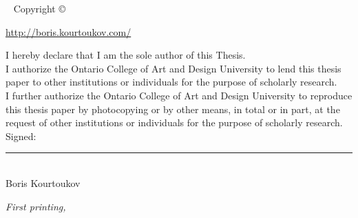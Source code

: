
\blankpage

\newpage\thispagestyle{empty}
\openepigraph{%
}{}
\vfill
{}
\vfill
\openepigraph{%
}{}


\maketitle


\newpage
\begin{fullwidth}
~\vfill
\thispagestyle{empty}
\setlength{\parindent}{0pt}
\setlength{\parskip}{\baselineskip}
Copyright \copyright\ \the\year\ \thanklessauthor

\par{\url{http://boris.kourtoukov.com/}}

\par I hereby declare that I am the sole author of this Thesis. \\
\vspace{1em}
I authorize the Ontario College of Art and Design University to lend this thesis paper to other institutions or individuals for the purpose of scholarly research. \\
\vspace{1em}
I further authorize the Ontario College of Art and Design University to reproduce this thesis paper by photocopying or by other means, in total or in part, at the request of other institutions or individuals for the purpose of scholarly research. \\

\vspace{2em}
Signed: \\
\hspace{3.5em}\noindent\rule{8cm}{0.5pt} \\
\hspace{3.5em}Boris Kourtoukov


\par\textit{First printing, \monthyear}
\end{fullwidth}

